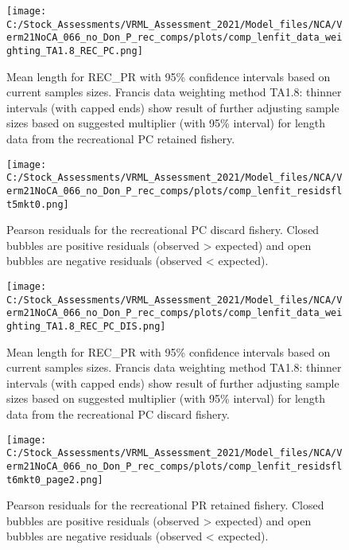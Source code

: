 \documentclass[11pt,
  english,
  a4paper,
]{article}
\begin{document}
\begin{figure}
\centering
\texttt{[image: C:/Stock\_Assessments/VRML\_Assessment\_2021/Model\_files/NCA/Verm21NoCA\_066\_no\_Don\_P\_rec\_comps/plots/comp\_lenfit\_data\_weighting\_TA1.8\_REC\_PC.png]}
\caption{Mean length for REC\_PR with 95\% confidence intervals based on current samples sizes. Francis data weighting method TA1.8: thinner intervals (with capped ends) show result of further adjusting sample sizes based on suggested multiplier (with 95\% interval) for length data from the recreational PC retained fishery.\label{fig:mean-len-fit-REC-PC}}
\end{figure}

\begin{figure}
\centering
\texttt{[image: C:/Stock\_Assessments/VRML\_Assessment\_2021/Model\_files/NCA/Verm21NoCA\_066\_no\_Don\_P\_rec\_comps/plots/comp\_lenfit\_residsflt5mkt0.png]}
\caption{Pearson residuals for the recreational PC discard fishery. Closed bubbles are positive residuals (observed \textgreater{} expected) and open bubbles are negative residuals (observed \textless{} expected).\label{fig:len-pearson-REC-PC-DIS}}
\end{figure}

\begin{figure}
\centering
\texttt{[image: C:/Stock\_Assessments/VRML\_Assessment\_2021/Model\_files/NCA/Verm21NoCA\_066\_no\_Don\_P\_rec\_comps/plots/comp\_lenfit\_data\_weighting\_TA1.8\_REC\_PC\_DIS.png]}
\caption{Mean length for REC\_PR with 95\% confidence intervals based on current samples sizes. Francis data weighting method TA1.8: thinner intervals (with capped ends) show result of further adjusting sample sizes based on suggested multiplier (with 95\% interval) for length data from the recreational PC discard fishery.\label{fig:mean-len-fit-REC-PC-DIS}}
\end{figure}

\begin{figure}
\centering
\texttt{[image: C:/Stock\_Assessments/VRML\_Assessment\_2021/Model\_files/NCA/Verm21NoCA\_066\_no\_Don\_P\_rec\_comps/plots/comp\_lenfit\_residsflt6mkt0\_page2.png]}
\caption{Pearson residuals for the recreational PR retained fishery. Closed bubbles are positive residuals (observed \textgreater{} expected) and open bubbles are negative residuals (observed \textless{} expected).\label{fig:len-pearson-REC-PR}}
\end{figure}
\end{document}

